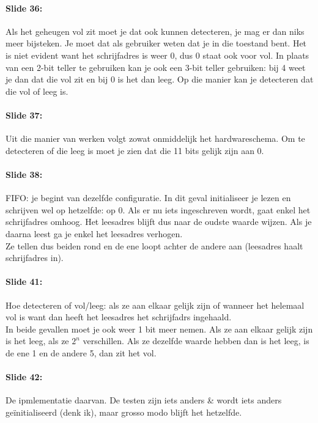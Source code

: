 \documentclass[10pt,a4paper]{book}
\begin{document}
\paragraph{Slide 36:} Als het geheugen vol zit moet je dat ook kunnen detecteren, je mag er dan niks meer bijsteken. Je moet dat als gebruiker weten dat je in die toestand bent. Het is niet evident want het schrijfadres is weer 0, dus 0 staat ook voor vol. In plaats van een 2-bit teller te gebruiken kan je ook een 3-bit teller gebruiken: bij 4 weet je dan dat die vol zit en bij 0 is het dan leeg. Op die manier kan je detecteren dat die vol of leeg is.

\paragraph{Slide 37:} Uit die manier van werken volgt zowat onmiddelijk het hardwareschema. Om te detecteren of die leeg is moet je zien dat die 11 bits gelijk zijn aan 0.

\paragraph{Slide 38:} FIFO: je begint van dezelfde configuratie. In dit geval initialiseer je lezen en schrijven wel op hetzelfde: op 0. Als er nu iets ingeschreven wordt, gaat enkel het schrijfadres omhoog. Het leesadres blijft dus naar de oudste waarde wijzen. Als je daarna leest ga je enkel het leesadres verhogen.\\
Ze tellen dus beiden rond en de ene loopt achter de andere aan (leesadres haalt schrijfadres in).

\paragraph{Slide 41:} Hoe detecteren of vol/leeg: als ze aan elkaar gelijk zijn of wanneer het helemaal vol is want dan heeft het leesadres het schrijfadrs ingehaald.\\
In beide gevallen moet je ook weer 1 bit meer nemen. Als ze aan elkaar gelijk zijn is het leeg, als ze $2^n$ verschillen. Als ze dezelfde waarde hebben dan is het leeg, is de ene 1 en de andere 5, dan zit het vol.

\paragraph{Slide 42:} De ipmlementatie daarvan. De testen zijn iets anders \& wordt iets anders ge\"initialiseerd (denk ik), maar grosso modo blijft het hetzelfde.
\end{document}
